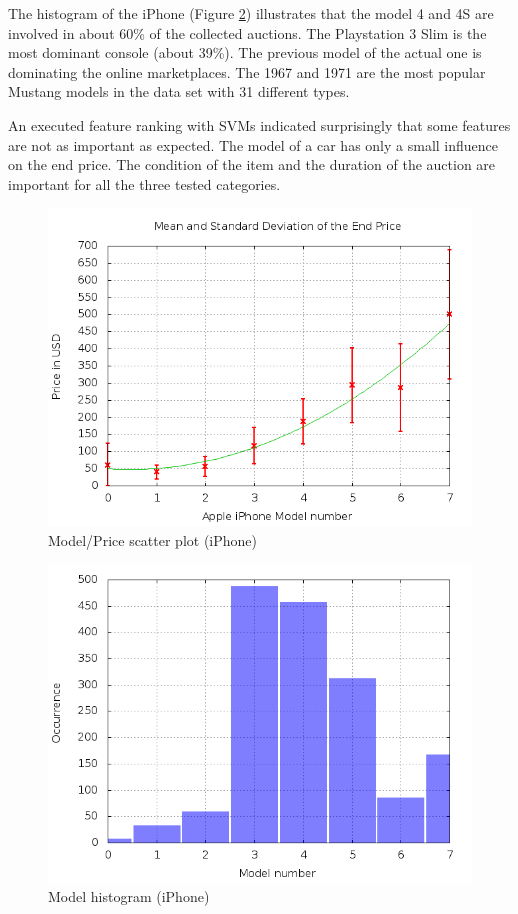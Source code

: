 The histogram of the iPhone (Figure \ref{model_hist_iphone}) illustrates that the model 4 and 4S are involved in about 60\% of the collected auctions. The Playstation 3 Slim is the most dominant console (about 39\%). The previous model of the actual one is dominating the online marketplaces. The 1967 and 1971 are the most popular Mustang models in the data set with 31 different types.

An executed feature ranking \cite{guyon} with SVMs indicated surprisingly that some features are not as important as expected. The model of a car has only a small influence on the end price. The condition of the item and the duration of the auction are important for all the three tested categories.
\begin{figure}
\centering
\includegraphics[scale=0.5]{images/plots/iphone/price_model_iphone.png}
\caption{Model/Price scatter plot (iPhone)}
\label{model_price_iphone}
\end{figure}
\begin{figure}
\centering
\includegraphics[scale=0.5]{images/plots/iphone/hist_model_iphone.png}
\caption{Model histogram (iPhone)}
\label{model_hist_iphone}
\end{figure}

